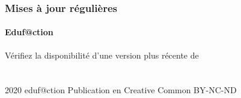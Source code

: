 \begin{frame}
\begin{columns}
\begin{column}{0.1\textwidth}
\begin{figure}
				  \end{figure}
		\end{column}
		\begin{column}{0.9\textwidth}
							
		\end{column}
\end{columns}
 \end{frame}
 
\begin{frame}
\frametitle{Mises à jour régulières}
\framesubtitle{Eduf@ction~\umaila}
{\begin{center} 
 {Vérifiez la disponibilité d'une version plus récente de} \\
 { }   \\ 
{{\huge\ccbyncndeu}}  \\  
{2020 eduf@ction Publication en Creative Common BY-NC-ND }    \\  %
{\safeqrcode[padding]{\GITfilename}}  
\end{center} }
\end{frame}






